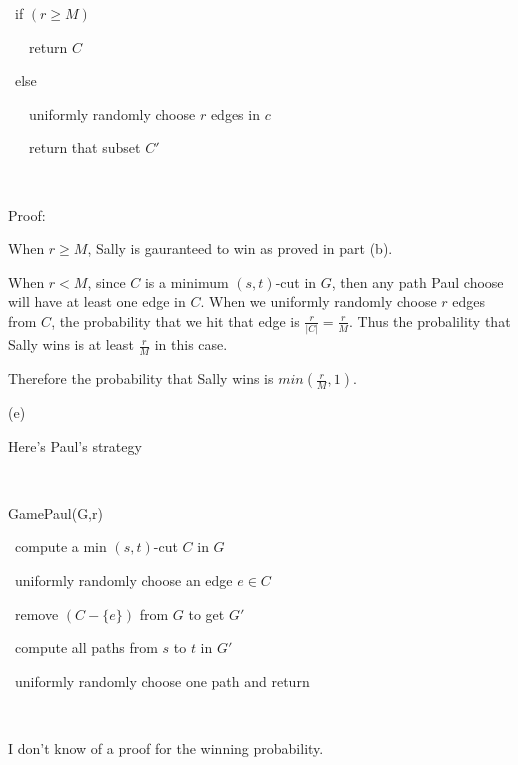 \documentclass[a4paper,12pt]{article}
\begin{document}
\ if $(r\geq M)$ 

\ \ \ return $C$

\ else 

\ \ \ uniformly randomly choose $r$ edges in $c$

\ \ \ return that subset $C'$

\

Proof:

When $r\geq M$, Sally is gauranteed to win as proved in part (b).

When $r<M$, since $C$ is a minimum $(s,t)$-cut in $G$, then any path Paul choose will have at least one edge in $C$. When we uniformly randomly choose $r$ edges from $C$, the probability that we hit that edge is $\frac{r}{\left|C\right|}=\frac{r}{M}$. Thus the probalility that Sally wins is at least $\frac{r}{M}$ in this case.

Therefore the probability that Sally wins is $min(\frac{r}{M},1)$.

(e)


Here's Paul's strategy

\

GamePaul(G,r)

\ compute a min $(s,t)$-cut $C$ in $G$

\ uniformly randomly choose an edge $e\in C$

\ remove $(C-\{e\})$ from $G$ to get $G'$

\ compute all paths from $s$ to $t$ in $G'$

\ uniformly randomly choose one path and return

\

I don't know of a proof for the winning probability.
\end{document}
